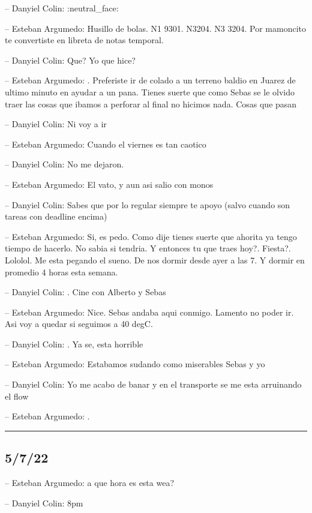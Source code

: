 -- Danyiel Colin: :neutral\_face:

-- Esteban Argumedo: Husillo de bolas. N1 9301. N3204. N3 3204. Por
mamoncito te convertiste en libreta de notas temporal.

-- Danyiel Colin: Que? Yo que hice?

-- Esteban Argumedo: . Preferiste ir de colado a un terreno baldio en
Juarez de ultimo minuto en ayudar a un pana. Tienes suerte que como
Sebas se le olvido traer las cosas que ibamos a perforar al final no
hicimos nada. Cosas que pasan

-- Danyiel Colin: Ni voy a ir

-- Esteban Argumedo: Cuando el viernes es tan caotico

-- Danyiel Colin: No me dejaron.

-- Esteban Argumedo: El vato, y aun asi salio con monos

-- Danyiel Colin: Sabes que por lo regular siempre te apoyo (salvo
cuando son tareas con deadline encima)

-- Esteban Argumedo: Si, es pedo. Como dije tienes suerte que ahorita ya
tengo tiempo de hacerlo. No sabia si tendria. Y entonces tu que traes
hoy?. Fiesta?. Lololol. Me esta pegando el sueno. De nos dormir desde
ayer a las 7. Y dormir en promedio 4 horas esta semana.

-- Danyiel Colin: . Cine con Alberto y Sebas

-- Esteban Argumedo: Nice. Sebas andaba aqui conmigo. Lamento no poder
ir. Asi voy a quedar si seguimos a 40 degC.

-- Danyiel Colin: . Ya se, esta horrible

-- Esteban Argumedo: Estabamos sudando como miserables Sebas y yo

-- Danyiel Colin: Yo me acabo de banar y en el transporte se me esta
arruinando el flow

-- Esteban Argumedo: .

\begin{center}\rule{0.5\linewidth}{0.5pt}\end{center}

\hypertarget{section-71}{%
\subsection{5/7/22}\label{section-71}}

-- Esteban Argumedo: a que hora es esta wea?

-- Danyiel Colin: 8pm

